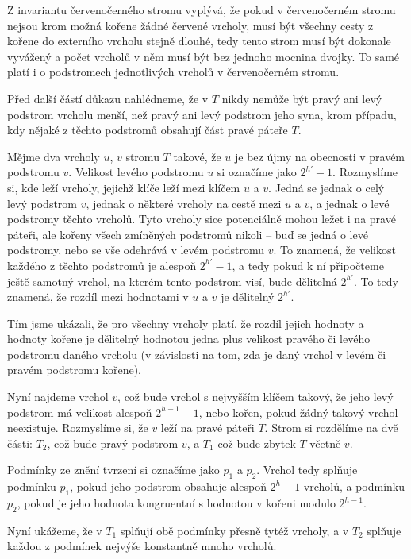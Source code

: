 \begin{dukaz}
Z invariantu červenočerného stromu vyplývá, že pokud v červenočerném stromu nejsou krom možná kořene žádné červené vrcholy, musí být všechny cesty z kořene do externího vrcholu stejně dlouhé, tedy tento strom musí být dokonale vyvážený a počet vrcholů v něm musí být bez jednoho mocnina dvojky. To samé platí i o podstromech jednotlivých vrcholů v červenočerném stromu.

Před další částí důkazu nahlédneme, že v $T$ nikdy nemůže být pravý ani levý podstrom vrcholu menší, než pravý ani levý podstrom jeho syna, krom případu, kdy nějaké z těchto podstromů obsahují část pravé páteře $T$.

Mějme dva vrcholy $u$, $v$ stromu $T$ takové, že $u$ je bez újmy na obecnosti v pravém
podstromu $v$. Velikost levého podstromu $u$ si označíme jako $2^{h'}-1$. Rozmyslíme si, kde leží vrcholy, jejichž klíče leží mezi klíčem
$u$ a $v$. Jedná se jednak o celý levý podstrom $v$, jednak o některé vrcholy
na cestě mezi $u$ a $v$, a jednak o levé podstromy těchto vrcholů. Tyto vrcholy
sice potenciálně mohou ležet i na pravé páteři, ale kořeny všech zmíněných podstromů nikoli -- buď se jedná o levé podstromy, nebo se vše odehrává v levém podstromu $v$. To znamená, že velikost každého z těchto podstromů je alespoň $2^{h'} - 1$, a tedy pokud k ní připočteme ještě samotný vrchol, na kterém tento podstrom visí, bude dělitelná $2^{h'}$. To tedy znamená, že rozdíl mezi hodnotami v $u$ a $v$ je dělitelný $2^{h'}$.

\begin{pozorovani}\label{poz:1}
Tím jsme ukázali, že pro všechny vrcholy platí, že rozdíl jejich hodnoty a hodnoty kořene je dělitelný hodnotou jedna plus velikost pravého či levého podstromu daného vrcholu (v závislosti na tom, zda je daný vrchol v levém či pravém podstromu kořene).
\end{pozorovani}

Nyní najdeme vrchol $v$, což bude vrchol s nejvyšším klíčem takový, že jeho levý
podstrom má velikost alespoň $2^{h-1} -1$, nebo kořen, pokud žádný takový vrchol neexistuje. Rozmyslíme si, že $v$ leží na pravé páteři $T$. Strom si
rozdělíme na dvě části: $T_2$, což bude pravý podstrom $v$, a $T_1$ což bude zbytek $T$ včetně $v$.

Podmínky ze znění tvrzení si označíme jako $p_1$ a $p_2$. Vrchol tedy splňuje podmínku $p_1$, pokud jeho podstrom obsahuje alespoň $2^h-1$ vrcholů, a podmínku $p_2$, pokud je jeho hodnota kongruentní s hodnotou v kořeni modulo $2^{h-1}$.

Nyní ukážeme, že v $T_1$ splňují obě podmínky přesně tytéž vrcholy, a v $T_2$ splňuje každou z podmínek nejvýše konstantně mnoho vrcholů.


\end{dukaz}
